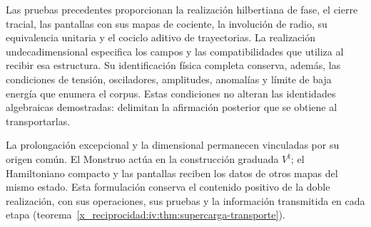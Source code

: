 Las pruebas precedentes proporcionan la realización
hilbertiana de fase, el cierre tracial, las pantallas
con sus mapas de cociente, la involución de radio,
su equivalencia unitaria y el cociclo aditivo de
trayectorias. La realización undecadimensional
especifica los campos y las compatibilidades que
utiliza al recibir esa estructura. Su identificación
física completa conserva, además, las condiciones
de tensión, osciladores, amplitudes, anomalías y
límite de baja energía que enumera el corpus.
Estas condiciones no alteran las identidades
algebraicas demostradas: delimitan la afirmación
posterior que se obtiene al transportarlas.

La prolongación excepcional y la dimensional
permanecen vinculadas por su origen común. El
Monstruo actúa en la construcción graduada
\(V^\natural\); el Hamiltoniano compacto y las
pantallas reciben los datos de otros mapas del
mismo estado. Esta formulación conserva el
contenido positivo de la doble realización,
con sus operaciones, sus pruebas y la información
transmitida en cada etapa (teorema~\ref{x_reciprocidad:iv:thm:supercarga-transporte}).
